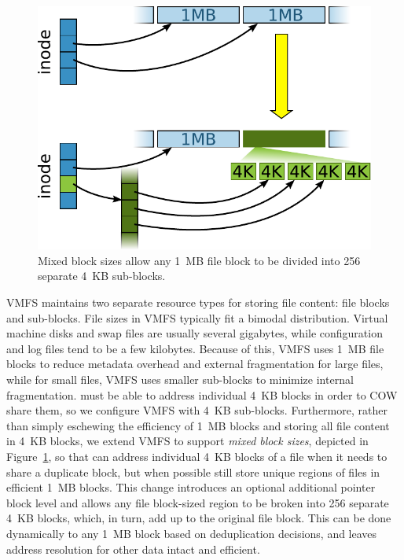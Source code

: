 
\begin{figure}[t]
\centerline {
\includegraphics[scale=0.45]{figures/mixed.pdf}
}
\caption{Mixed block sizes allow any 1~MB file block to be divided into
  256 separate 4~KB sub-blocks.}
\label{fig:mixed-block-sizes}
\end{figure}

VMFS maintains two separate resource types for storing file content:
file blocks and sub-blocks.  File sizes in VMFS typically fit a
bimodal distribution.  Virtual machine disks and swap files are
usually several gigabytes, while configuration and log files tend to
be a few kilobytes.  Because of this, VMFS uses 1~MB file blocks to
reduce metadata overhead and external fragmentation for large files,
while for small files, VMFS uses smaller
sub-blocks to minimize internal fragmentation.
\DeDe must be able to address individual 4~KB blocks in order to COW
share them, so we configure VMFS with 4~KB sub-blocks.
Furthermore, rather than simply eschewing the efficiency of 1~MB blocks
and storing all file content in 4~KB blocks, we extend VMFS to
support \emph{mixed block sizes}, depicted in
Figure~\ref{fig:mixed-block-sizes}, so that \DeDe can address
individual
4~KB blocks of a file when it needs to share a duplicate block, but
when possible still store unique regions of files in efficient 1~MB
blocks.  This change introduces an optional additional pointer block
level and allows any file block-sized region to be broken into 256 
separate 4~KB blocks, which, in turn, add up to the original file
block.  This can be done
dynamically to any 1~MB block based on deduplication decisions,
and leaves address resolution for other data intact and efficient.

